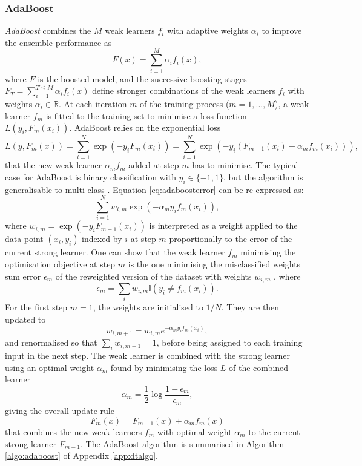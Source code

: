 \subsubsection{AdaBoost}\label{sub-adaboosted}
\textit{AdaBoost} combines the $M$ weak learners $f_i$ with adaptive weights $\alpha_i$ to improve the ensemble performance as \[F(x) = \sum_{i=1}^M \alpha_i f_i(x),\] where $F$ is the boosted model, and the successive boosting stages $F_T = \sum_{i=1}^{T \leq M} \alpha_i f_i(x)$ define stronger combinations of the weak learners $f_i$ with weights $\alpha_i \in \mathbb{R}$. At each iteration $m$ of the training process ($m = 1, ..., M$), a weak learner $f_m$ is fitted to the training set to minimise a loss function $L(y_i, F_{m}(x_i))$. AdaBoost relies on the exponential loss
\begin{equation}\label{eq:adaboosterror}
    L(y, F_m(x)) = \sum_{i=1}^N \exp\left(-y_i F_m(x_i)\right) = \sum_{i=1}^N \exp\left(-y_i (F_{m-1}(x_i) + \alpha_m f_m(x_i))\right),
\end{equation}
that the new weak learner $\alpha_m f_m$ added at step $m$ has to minimise. The typical case for AdaBoost is binary classification with $y_i \in \{-1, 1\}$, but the algorithm is generalisable to multi-class \cite{MurphyML}. Equation \ref{eq:adaboosterror} can be re-expressed as: \[\sum_{i=1}^N w_{i,m} \exp\left(-\alpha_m y_i f_m(x_i)\right),\] where $w_{i,m} = \exp\left(-y_i F_{m-1}(x_i)\right)$ is interpreted as a weight applied to the data point $(x_i, y_i)$  indexed by $i$ at step $m$ proportionally to the error of the current strong learner. One can show that the weak learner $f_m$ minimising the optimisation objective at step $m$ is the one minimising the misclassified weights sum error $\epsilon_m$ of the reweighted version of the dataset with weights $w_{i,m}$ \cite{MurphyML}, where \[\epsilon_m = \sum_i w_{i,m} \mathbb{I}(y_i \neq f_m(x_i)).\] For the first step $m = 1$, the weights are initialised to $1 / N$. They are then updated to \[w_{i,m+1} = w_{i,m} e^{-\alpha_m y_i f_m(x_i)},\] and renormalised so that $\sum_i w_{i, m+1} = 1$, before being assigned to each training input in the next step. The weak learner is combined with the strong learner using an optimal weight $\alpha_m$ found by minimising the loss $L$ of the combined learner \[\alpha_m = \frac{1}{2} \log \frac{1 - \epsilon_m}{\epsilon_m},\] giving the overall update rule
\begin{equation}\label{eq:updateOverall}
    F_m(x) = F_{m-1}(x) + \alpha_m f_m(x)
\end{equation}
that combines the new weak learners $f_m$ with optimal weight $\alpha_m$ to the current strong learner $F_{m-1}$. The AdaBoost algorithm is summarised in Algorithm \ref{algo:adaboost} of Appendix \ref{app:dtalgo}.

